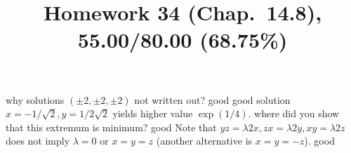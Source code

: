 \documentclass[pstricks,10pt,dvipsnames]{article} %
\title{Homework 34 (Chap.~14.8),
55.00/80.00 (68.75\%)
}
\begin{document}
\maketitle
{}
why solutions $(\pm2,\pm2,\pm2)$ not written out?
good
good
solution $x=-1/\sqrt{2},y=1/2\sqrt{2}$ yields higher value $\exp(1/4)$.
where did you show that this extremum is minimum?
good
Note that $yz=\lambda 2x,zx=\lambda2y,xy=\lambda2z$ does not imply $\lambda=0$ or $x=y=z$
(another alternative is $x=y=-z$).
good
\end{document}
